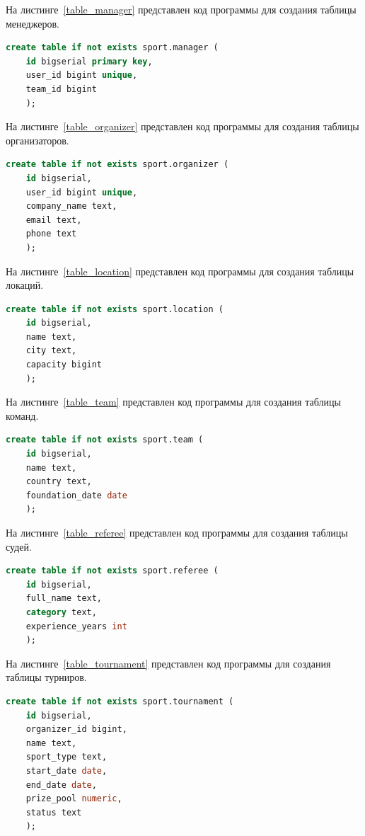 На листинге~\ref{table_manager} представлен код программы для создания таблицы менеджеров.

\begin{lstlisting}[language=SQL, caption=\raggedright{Создание таблицы менеджеров}, label=table_manager]
	create table if not exists sport.manager (
	id bigserial primary key,
	user_id bigint unique,
	team_id bigint
	);
\end{lstlisting}

На листинге~\ref{table_organizer} представлен код программы для создания таблицы организаторов.

\begin{lstlisting}[language=SQL, caption=\raggedright{Создание таблицы организаторов}, label=table_organizer]
	create table if not exists sport.organizer (
	id bigserial,
	user_id bigint unique,
	company_name text,
	email text,
	phone text
	);
\end{lstlisting}

На листинге~\ref{table_location} представлен код программы для создания таблицы локаций.

\begin{lstlisting}[language=SQL, caption=\raggedright{Создание таблицы локаций}, label=table_location]
	create table if not exists sport.location (
	id bigserial,
	name text,
	city text,
	capacity bigint
	);
\end{lstlisting}

На листинге~\ref{table_team} представлен код программы для создания таблицы команд.

\begin{lstlisting}[language=SQL, caption=\raggedright{Создание таблицы команд}, label=table_team]
	create table if not exists sport.team (
	id bigserial,
	name text,
	country text,
	foundation_date date
	);
\end{lstlisting}

На листинге~\ref{table_referee} представлен код программы для создания таблицы судей.

\begin{lstlisting}[language=SQL, caption=\raggedright{Создание таблицы судей}, label=table_referee]
	create table if not exists sport.referee (
	id bigserial,
	full_name text,
	category text,
	experience_years int
	);
\end{lstlisting}

На листинге~\ref{table_tournament} представлен код программы для создания таблицы турниров.

\begin{lstlisting}[language=SQL, caption=\raggedright{Создание таблицы турниров}, label=table_tournament]
	create table if not exists sport.tournament (
	id bigserial,
	organizer_id bigint,
	name text,
	sport_type text,
	start_date date,
	end_date date,
	prize_pool numeric,
	status text
	);
\end{lstlisting}

